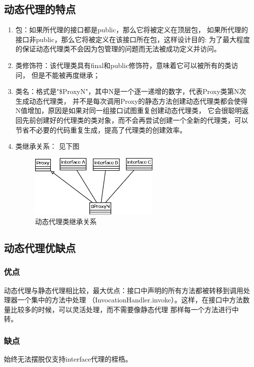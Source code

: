 \subsection{动态代理的特点}
\begin{enumerate}
	\item 包：如果所代理的接口都是public，那么它将被定义在顶层包，
	如果所代理的接口非public，那么它将被定义在该接口所在包，这样设计目的:
	为了最大程度的保证动态代理类不会因为包管理的问题而无法被成功定义并访问。
	\item 类修饰符：该代理类具有final和public修饰符，意味着它可以被所有的类访问，
	但是不能被再度继承；
	\item 类名：格式是"\$ProxyN"，其中N是一个逐一递增的数字，代表Proxy类第N次生成动态代理类，
	并不是每次调用Proxy的静态方法创建动态代理类都会使得N值增加，原因是如果对同一组接口试图重复创建动态代理类，
	它会很聪明返回先前创建好的代理类的类对象，而不会再尝试创建一个全新的代理类，可以节省不必要的代码重复生成，提高了代理类的创建效率。
	\item 类继承关系：
	\subitem 见下图
	\begin{figure}[!h]
		\centering
		\includegraphics[width=0.6\textwidth]{image/dynamic.png}
		\caption{动态代理类继承关系}
	\end{figure}
\end{enumerate}
\subsection{动态代理优缺点}
\subsubsection{优点}
动态代理与静态代理相比较，最大优点：接口中声明的所有方法都被转移到调用处理器一个集中的方法中处理
（InvocationHandler.invoke）。这样，在接口中方法数量比较多的时候，可以灵活处理，而不需要像静态代理
那样每一个方法进行中转。
\subsubsection{缺点}
始终无法摆脱仅支持interface代理的桎梏。

